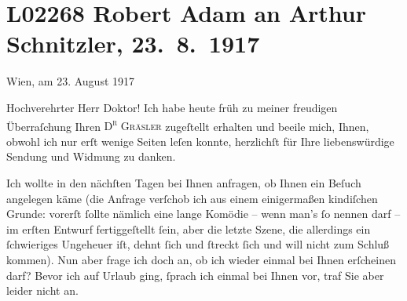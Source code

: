 

\section[Robert Adam an Arthur Schnitzler, 23. 8. 1917]{L02268 Robert Adam an Arthur Schnitzler, 23. 8. 1917}
\nopagebreak{}
\rehead{ }\normalsize\beginnumbering{}
\toendnotes[C]{\smallbreak\pagebreak[2]}
\toendnotes[C]{\smallbreak}
\pstart
           \raggedleft{}{\pb}Wien, am 23. August 1917\pend
           
\pstart{}Hochverehrter Herr Doktor!\pend\vspace{0.5em}
\pstart
           Ich habe heute früh zu meiner freudigen Überraſchung Ihren \textsc{D\textsuperscript{r}{ }Gräsler} zugeſtellt erhalten und beeile mich, Ihnen, obwohl ich nur erſt wenige Seiten
               leſen konnte, herzlichſt für Ihre liebenswürdige Sendung und Widmung zu danken.\pend
           
\pstart
           Ich wollte in den nächſten Tagen bei Ihnen anfragen, ob Ihnen ein Beſuch angelegen
               käme (die Anfrage verſchob ich aus einem einigermaßen kindiſchen Grunde: vorerſt
               ſollte nämlich eine lange Komödie – wenn man’s ſo  nennen darf – im
               erſten Entwurf fertiggeſtellt ſein, aber die letzte Szene, die allerdings ein
               ſchwieriges Unge{\pb}heuer iſt, dehnt ſich und ſtreckt
               ſich und will nicht zum Schluß kommen). Nun aber frage ich doch an, ob ich wieder
               einmal bei Ihnen erſcheinen darf? Bevor ich auf Urlaub ging, ſprach ich einmal bei
               Ihnen vor, traf Sie aber leider nicht an.\pend
           
